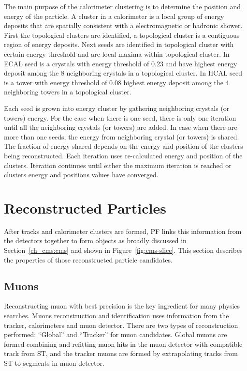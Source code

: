 The main purpose of the calorimeter clustering is to determine the position and
energy of the particle. A cluster in a calorimeter is a local group of
energy deposits that are spatially consistent with a electromagnetic
or hadronic shower. First the topological
clusters are identified, a topological cluster is a contiguous region of energy
deposits. Next seeds are identified in topological cluster with certain energy
threshold and are local maxima within topological cluster.
In \gls{ECAL} seed is a crystals with energy threshold of 0.23 \GeV{}
and have highest energy deposit among the 8 neighboring
crystals in a topological cluster.
In \gls{HCAL} seed is a tower with energy threshold of 0.08 \GeV{} highest
energy deposit among the 4 neighboring towers in a topological cluster.

Each seed is grown into energy cluster by gathering neighboring crystals (or towers)
energy.
For the case when there is one seed, there is only one
iteration until all the neighboring crystals (or towers) are added.
In case when there are more than one seeds,
the energy from neighboring crystal (or towers) is shared.
The fraction of energy shared depends on the energy and position of the
clusters being reconstructed.
Each iteration uses re-calculated energy and position of the clusters.
Iteration continues until either
the maximum iteration is reached or clusters
energy and positions values have converged.

\section{
  Reconstructed Particles
 }

After tracks and calorimeter clusters are formed, \gls{PF} links this information
from the detectors together to form objects as broadly discussed in
Section~\ref{ch_cms:cms} and shown in Figure~\ref{fig:cms-slice}. This section
describes the properties of those reconstructed particle candidates.

\subsection{
  Muons
}

Reconstructing muon with best precision is the key ingredient for many physics
searches. Muons reconstruction and identification uses information from the tracker,
calorimeters and muon detector. There are two types of reconstruction performed;
``Global'' and ``Tracker'' for muon candidates. Global muons are formed combining and refitting
muon hits in the muon detector with compatible track from \gls{ST}, and the tracker muons
are formed by extrapolating tracks from \gls{ST} to segments in muon detector.


